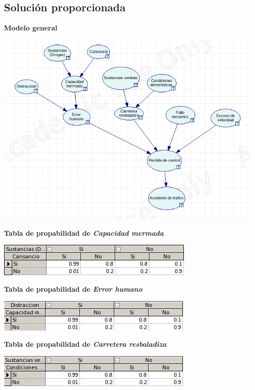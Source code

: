 \documentclass{article}
\begin{document}
\newpage

\subsection{Solución proporcionada}

\textbf{Modelo general}

\begin{center}
\includegraphics[scale=0.5]{Modelo7.png}
\end{center}

\textbf{Tabla de propabilidad de \textit{Capacidad mermada}}

\begin{center}
\includegraphics[scale=0.5]{Capacidad.png}
\end{center}

\textbf{Tabla de propabilidad de \textit{Error humano}}

\begin{center}
\includegraphics[scale=0.5]{Error.png}
\end{center}

\textbf{Tabla de propabilidad de \textit{Carretera resbaladiza}}

\begin{center}
\includegraphics[scale=0.5]{Carretera.png}
\end{center}
\end{document}
